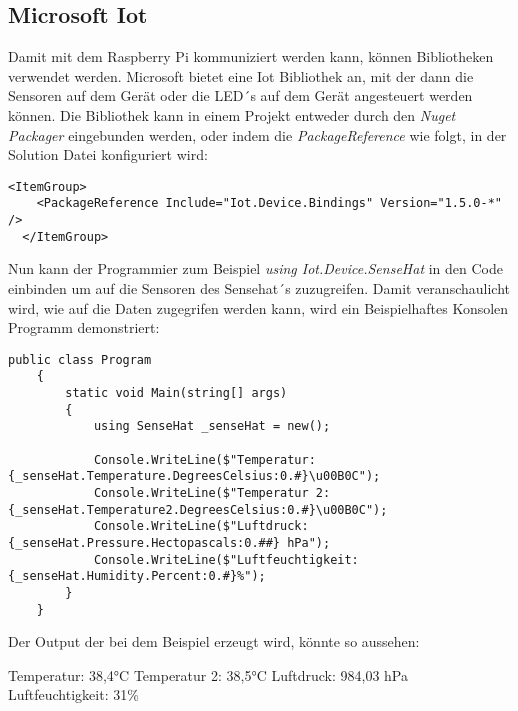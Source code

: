 \subsection{Microsoft Iot}
\label{subsec:MicrosoftIot}
Damit mit dem Raspberry Pi kommuniziert werden kann, können Bibliotheken verwendet werden.
Microsoft bietet eine Iot Bibliothek an, mit der dann die Sensoren auf dem Gerät oder die LED´s auf
dem Gerät angesteuert werden können. Die Bibliothek kann in einem Projekt entweder durch den
\emph{Nuget Packager} eingebunden werden, oder indem die \emph{PackageReference} wie folgt, in
der Solution Datei konfiguriert wird:

\begin{lstlisting}[language={[Sharp]C}, caption=Iot Nuget Package,
    label=lst:IotNugetPackage]
    <ItemGroup>
    <PackageReference Include="Iot.Device.Bindings" Version="1.5.0-*" />
  </ItemGroup>
\end{lstlisting}

Nun kann der Programmier zum Beispiel \emph{using Iot.Device.SenseHat} in den Code einbinden um
auf die Sensoren des Sensehat´s zuzugreifen. Damit veranschaulicht wird, wie auf die
Daten zugegrifen werden kann, wird ein Beispielhaftes Konsolen Programm demonstriert:

\begin{lstlisting}[language={[Sharp]C}, caption=SenseHat Beispiel Programm,
    label=lst:SenseHatBeispielProgramm]
    public class Program
    {
        static void Main(string[] args)
        {
            using SenseHat _senseHat = new();

            Console.WriteLine($"Temperatur: {_senseHat.Temperature.DegreesCelsius:0.#}\u00B0C");
            Console.WriteLine($"Temperatur 2: {_senseHat.Temperature2.DegreesCelsius:0.#}\u00B0C");
            Console.WriteLine($"Luftdruck: {_senseHat.Pressure.Hectopascals:0.##} hPa");
            Console.WriteLine($"Luftfeuchtigkeit: {_senseHat.Humidity.Percent:0.#}%");
        }
    }
\end{lstlisting}

Der Output der bei dem Beispiel erzeugt wird, könnte so aussehen:

\begin{zitat}
    Temperatur: 38,4°C
    \newline
    Temperatur 2: 38,5°C
    \newline
    Luftdruck: 984,03 hPa
    \newline
    Luftfeuchtigkeit: 31\%
\end{zitat}